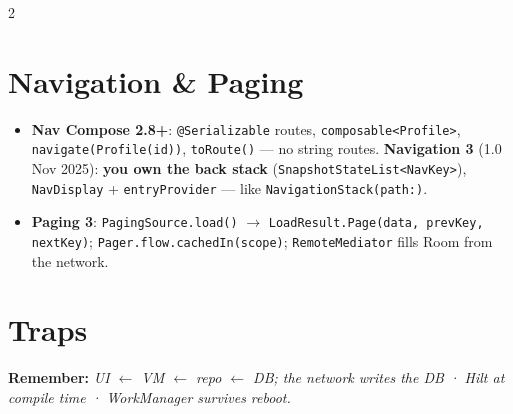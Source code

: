 \documentclass[8pt]{extarticle}
\begin{document}
\begin{multicols}{2}
\section{Navigation \& Paging}
\begin{itemize}\raggedright
  \item \textbf{Nav Compose 2.8+}: \texttt{@Serializable} routes, \texttt{composable<Profile>},
        \texttt{navigate(Profile(id))}, \texttt{toRoute()} — no string routes.
        \textbf{Navigation 3} (1.0 Nov 2025): \textbf{you own the back stack}
        (\texttt{SnapshotStateList<NavKey>}), \texttt{NavDisplay} + \texttt{entryProvider}
        — like \texttt{NavigationStack(path:)}.
  \item \textbf{Paging 3}: \texttt{PagingSource.load()} $\to$ \texttt{LoadResult.Page(data,
        prevKey, nextKey)}; \texttt{Pager.flow.cachedIn(scope)}; \texttt{RemoteMediator}
        fills Room from the network.
\end{itemize}

\section{Traps}
\begin{itemize}\raggedright
\end{itemize}

\textbf{Remember:} \emph{UI $\leftarrow$ VM $\leftarrow$ repo $\leftarrow$ DB; the network
writes the DB · Hilt at compile time · WorkManager survives reboot.}


\end{multicols}

\end{document}
